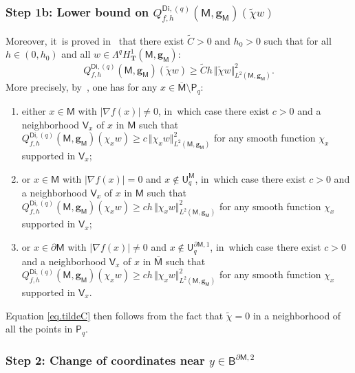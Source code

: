 \documentclass[JEP,XML,SOM,Unicode,NoEqCountersInSection,NoFloatCountersInSection,published]{cedram}
\newcommand{\mbf}[1]{\mathbf{#1}}
\let\pa\partial
\theoremstyle{plain}
\theoremstyle{definition}
\begin{document}
\subsubsection*{Step 1b: Lower bound on $Q_{f,h}^{\mathsf{Di},(q)}(\mathsf M,\mbf g_{\mathsf M})(\tilde \chi w)$} Moreover, it~is proved
in~\cite[\S3.4]{helffer-nier-06} that there exist $\tilde C>0$ and $h_0>0$ such that for all $h\in (0,h_0)$ and all $w\in \Lambda^qH^1_{\mbf T}(\mathsf M,\mbf g_{\mathsf M})$:
\begin{equation}\label{eq.tildeC}
Q_{f,h}^{\mathsf{Di},(q)}(\mathsf M,\mbf g_{\mathsf M})(\tilde \chi w)\ge \tilde Ch\, \Vert\tilde \chi w \Vert_{L^2(\mathsf M,\mbf g_{\mathsf M})}^2.
\end{equation}
More precisely, by~\cite[\S3.4]{helffer-nier-06}, one has for any $x\in \overline{\mathsf M}\setminus \mathsf P_q$:
\begin{enumerate}
\item\label{step:1b1}
either $x\in \mathsf M$ with $\vert \nabla f(x)\vert \neq 0$, in~which case there exist $c>0$ and a neighborhood $\mathsf V_x$ of $x$ in $\mathsf M$ such that $Q_{f,h}^{\mathsf{Di},(q)}(\mathsf M,\mbf g_{\mathsf M})(\chi_x w)\ge c\, \Vert \chi_x w \Vert_{L^2(\mathsf M,\mbf g_{\mathsf M})}^2$ for any smooth function $\chi_x$ supported in $\mathsf V_x$;
\item\label{step:1b2}
or $x\in \mathsf M$ with $\vert \nabla f(x)\vert = 0$ and $x\notin \mathsf U_q^{\mathsf M}$, in~which case there exist $c>0$ and a neighborhood $\mathsf V_x$ of $x$ in $\mathsf M$ such that $Q_{f,h}^{\mathsf{Di},(q)}(\mathsf M,\mbf g_{\mathsf M})(\chi_x w)\ge ch\, \Vert \chi_x w \Vert_{L^2(\mathsf M,\mbf g_{\mathsf M})}^2$ for any smooth function $\chi_x$ supported in $\mathsf V_x$;
\item\label{step:1b3}
or $x\in \pa \mathsf M$ with $\vert \nabla f(x)\vert \neq 0$ and $x\notin \mathsf U^{\pa \mathsf M,1}_q$, in~which case there exist $c>0$ and a neighborhood $\mathsf V_x$ of $x$ in $\overline{\mathsf M}$ such that $Q_{f,h}^{\mathsf{Di},(q)}(\mathsf M,\mbf g_{\mathsf M})(\chi_x w)\ge ch\, \Vert \chi_x w \Vert_{L^2(\mathsf M,\mbf g_{\mathsf M})}^2$ for any smooth function $\chi_x$ supported in $\mathsf V_x$.
\end{enumerate}
Equation \eqref{eq.tildeC} then follows from the fact that $\tilde \chi=0$ in a neighborhood of
all the points in $\mathsf P_q$.

\subsubsection*{Step 2: Change of coordinates near $y\in \mathsf B^{\pa \mathsf M,2}$}
\end{document}
